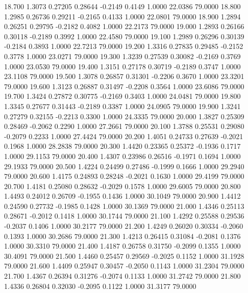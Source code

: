   18.700   1.3073   0.27205   0.28644  -0.2149   0.4149   1.0000  22.0386  79.0000
  18.800   1.2985   0.26736   0.29211  -0.2165   0.4133   1.0000  22.0801  79.0000
  18.900   1.2894   0.26251   0.29795  -0.2182   0.4082   1.0000  22.2173  79.0000
  19.000   1.2893   0.26166   0.30118  -0.2189   0.3992   1.0000  22.4580  79.0000
  19.100   1.2989   0.26296   0.30139  -0.2184   0.3893   1.0000  22.7213  79.0000
  19.200   1.3316   0.27835   0.29485  -0.2152   0.3778   1.0000  23.0271  79.0000
  19.300   1.3239   0.27539   0.30082  -0.2169   0.3769   1.0000  23.0530  79.0000
  19.400   1.3151   0.27178   0.30719  -0.2189   0.3747   1.0000  23.1108  79.0000
  19.500   1.3078   0.26857   0.31301  -0.2206   0.3670   1.0000  23.3201  79.0000
  19.600   1.3123   0.26887   0.31497  -0.2208   0.3564   1.0000  23.6086  79.0000
  19.700   1.3424   0.27872   0.30775  -0.2169   0.3403   1.0000  24.0481  79.0000
  19.800   1.3345   0.27677   0.31443  -0.2189   0.3387   1.0000  24.0905  79.0000
  19.900   1.3241   0.27279   0.32155  -0.2213   0.3300   1.0000  24.3335  79.0000
  20.000   1.3827   0.25309   0.28469  -0.2062   0.2290   1.0000  27.2661  79.0000
  20.100   1.3788   0.25531   0.29080  -0.2079   0.2233   1.0000  27.4424  79.0000
  20.200   1.4051   0.24733   0.27639  -0.2021   0.1968   1.0000  28.2838  79.0000
  20.300   1.4420   0.23365   0.25372  -0.1936   0.1717   1.0000  29.1153  79.0000
  20.400   1.4307   0.23986   0.26516  -0.1971   0.1694   1.0000  29.1933  79.0000
  20.500   1.4224   0.24499   0.27486  -0.1999   0.1666   1.0000  29.2940  79.0000
  20.600   1.4175   0.24893   0.28248  -0.2021   0.1630   1.0000  29.4199  79.0000
  20.700   1.4181   0.25080   0.28632  -0.2029   0.1578   1.0000  29.6005  79.0000
  20.800   1.4493   0.24012   0.26709  -0.1955   0.1436   1.0000  30.1049  79.0000
  20.900   1.4412   0.24590   0.27732  -0.1985   0.1428   1.0000  30.1369  79.0000
  21.000   1.4346   0.25113   0.28671  -0.2012   0.1418   1.0000  30.1744  79.0000
  21.100   1.4292   0.25588   0.29536  -0.2037   0.1406   1.0000  30.2177  79.0000
  21.200   1.4249   0.26020   0.30334  -0.2060   0.1393   1.0000  30.2686  79.0000
  21.300   1.4213   0.26415   0.31084  -0.2081   0.1376   1.0000  30.3310  79.0000
  21.400   1.4187   0.26758   0.31750  -0.2099   0.1355   1.0000  30.4091  79.0000
  21.500   1.4460   0.25457   0.29569  -0.2025   0.1152   1.0000  31.1928  79.0000
  21.600   1.4409   0.25947   0.30457  -0.2050   0.1143   1.0000  31.2304  79.0000
  21.700   1.4367   0.26394   0.31276  -0.2074   0.1133   1.0000  31.2742  79.0000
  21.800   1.4336   0.26804   0.32030  -0.2095   0.1122   1.0000  31.3177  79.0000
